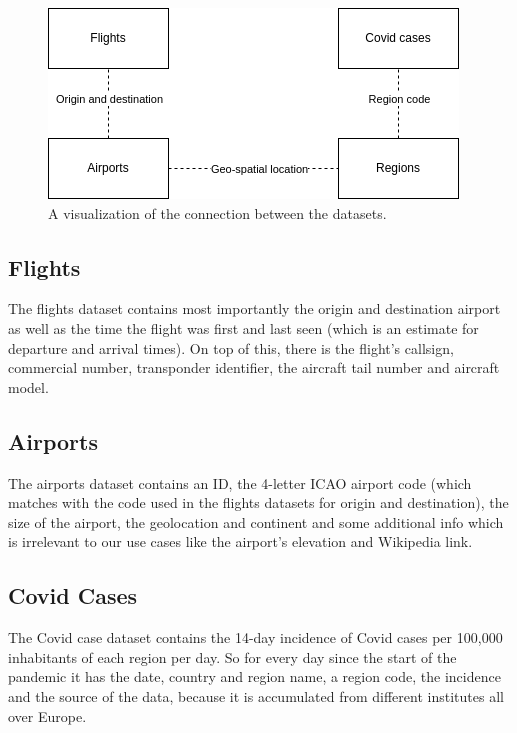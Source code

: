 \documentclass[11pt]{article}
\begin{document}
	\begin{figure}[h!]
		\centering
		\includegraphics[scale=0.6]{datasets.png}
		\caption{A visualization of the connection between the datasets.}
		\label{fig:datasets}
	\end{figure}

	\subsection{Flights}
	
	The flights dataset contains most importantly the origin and destination airport as well as the time the flight was first and last seen (which is an estimate for departure and arrival times). On top of this, there is the flight's callsign, commercial number, transponder identifier, the aircraft tail number and aircraft model.
	
	\subsection{Airports}
	
	The airports dataset contains an ID, the 4-letter ICAO airport code (which matches with the code used in the flights datasets for origin and destination), the size of the airport, the geolocation and continent and some additional info which is irrelevant to our use cases like the airport's elevation and Wikipedia link.
	
	\subsection{Covid Cases}
	
	The Covid case dataset contains the 14-day incidence of Covid cases per 100,000 inhabitants of each region per day. So for every day since the start of the pandemic it has the date, country and region name, a region code, the incidence and the source of the data, because it is accumulated from different institutes all over Europe.
	
\end{document}
